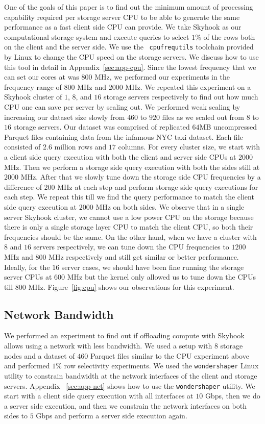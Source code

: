 \documentclass[12pt]{article}
\newcommand{\code}[1]{\colorbox{light-gray}{\texttt{#1}}}
\begin{document}
One of the goals of this paper is to find out the minimum amount of processing capability required per storage server CPU to be able to generate the same performance as a fast client side CPU can provide. We take Skyhook as our computational storage system and execute queries to select $1$\% of the rows both on the client and the server side. We use the ~\code{cpufrequtils} toolchain provided by Linux to change the CPU speed on the storage servers. We discuss how to use this tool in detail in Appendix~\ref{sec:app-cpu}. Since the lowest frequency that we can set our cores at was $800$ MHz, we performed our experiments in the frequency range of $800$ MHz and $2000$ MHz. We repeated this experiment on a Skyhook cluster of $1$, $8$, and $16$ storage servers respectively to find out how much CPU one can save per server by scaling out. We performed weak scaling by increasing our dataset size slowly from $460$ to $920$ files as we scaled out from $8$ to $16$ storage servers. Our dataset was comprised of replicated $64$MB uncompressed Parquet files containing data from the infamous NYC taxi dataset. Each file consisted of $2.6$ million rows and $17$ columns. For every cluster size, we start with a client side query execution with both the client and server side CPUs at $2000$ MHz. Then we perform a storage side query execution with both the sides still at $2000$ MHz. After that we slowly tune down the storage side CPU frequencies by a difference of $200$ MHz at each step and perform storage side query executions for each step. We repeat this till we find the query performance to match the client side query execution at $2000$ MHz on both sides. We observe that in a single server Skyhook cluster, we cannot use a low power CPU on the storage because there is only a single storage layer CPU to match the client CPU, so both their frequencies should be the same. On the other hand, when we have a cluster with $8$ and $16$ servers respectively, we can tune down the CPU frequencies to $1200$ MHz and $800$ MHz respectively and still get similar or better performance. Ideally, for the $16$ server cases, we should have been fine running the storage server CPUs at $600$ MHz but the kernel only allowed us to tune down the CPUs till $800$ MHz. Figure~\ref{fig:cpu} shows our observations for this experiment.

\subsection{Network Bandwidth}
We performed an experiment to find out if offloading compute with Skyhook allows using a network with less bandwidth. We used a setup with $8$ storage nodes and a dataset of $460$ Parquet files similar to the CPU experiment above and performed $1$\% row selectivity experiments. We used the \code{wondershaper} Linux utility to constrain bandwidth at the network interfaces of the client and storage servers. Appendix ~\ref{sec:app-net} shows how to use the \code{wondershaper} utility. We start with a client side query execution with all interfaces at $10$ Gbps, then we do a server side execution, and then we constrain the network interfaces on both sides to $5$ Gbps and perform a server side execution again.
\end{document}
